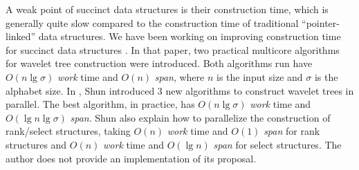 A weak point of succinct data structures is their construction time,
which is generally quite slow compared to the construction time of
traditional ``pointer-linked'' data structures. We have been working
on improving construction time for succinct data structures
\cite{Fuentes2014}. In that paper, two practical multicore algorithms
for wavelet tree construction were introduced. Both algorithms run
have $O(n\lg \sigma)$ {\em work} time and $O(n)$ {\em span}, where $n$
is the input size and $\sigma$ is the alphabet size. In
\cite{DBLP:journals/corr/Shun14}, Shun introduced 3 new algorithms to
construct wavelet trees in parallel. The best algorithm, in practice,
has $O(n\lg \sigma)$ {\em work} time and $O(\lg n\lg \sigma)$ {\em
span}. Shun also explain how to parallelize the construction of
rank/select structures, taking $O(n)$ {\em work} time and $O(1)$ {\em
span} for rank structures and $O(n)$ {\em work} time and $O(\lg n)$
{\em span} for select structures. The author does not provide an
implementation of its proposal.